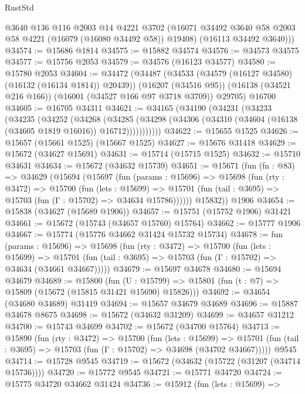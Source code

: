 \begin{lexlean}{RustStd}
\begin{coremodule}
        @3640
        @136
        @116
        @2003
        @14
        @4221
        @3702
        (@16071 @34492 @3640 @58 @2003 @58 @4221 (@16079 (@16080 @34492 @58)) @19408)
        (@16113 @34492 @3640)))
@34574 := @15686 @1814
@34575 := @15882 @34574
@34576 := @34573 @34575
@34577 := @15756 @2053
@34579 := @34576 (@16123 @34577)
@34580 := @15780 @2053
@34604 := @34472
    (@34487
      (@34533 (@34579 (@16127 @34580) (@16132 (@16134 @1814)) @20439))
      (@16207 (@34516 @95))
      (@16138 (@34521 @216 @166))
      (@16001 (@34527 @166 @97 @3718 @3709))
      @29705)
    @16700
@34605 := @16705 @34311
@34621 := @34165
    (@34190
      (@34231
        (@34233
          (@34235
            (@34252
              (@34268
                (@34285
                  (@34298 (@34306 (@34310 (@34604 (@16138 (@34605 @1819 @16016)) @16712)))))))))))
@34622 := @15655 @1525
@34626 := @15657 (@15661 @1525) (@15667 @1525)
@34627 := @15676 @31418
@34629 := @15672 (@34627 @15691)
@34631 := @15714 (@15715 @1525)
@34632 := @15710 @34631
@34634 := @15672 (@34632 @15739)
@34651 := @15671
    (fun (fn : @83) =>
    @34629
      (@15694
        (@15697
          (fun (params : @15696) =>
          @15698
            (fun (rty : @3472) =>
            @15700
              (fun (lets : @15699) =>
              @15701 (fun (tail : @3695) => @15703 (fun (Γ : @15702) => @34634 @15786))))))
        @15832))
    @1906
@34654 := @15838 (@34627 (@15689 @1906))
@34657 := @15751 (@15752 @1906) @31421
@34661 := @15672 (@15743 (@34657 @15760) @15764)
@34662 := @15777 @1906
@34667 := @15774 (@15776 @34662 @31424 @15732 @15734)
@34678 := fun (params : @15696) =>
  @15698
    (fun (rty : @3472) =>
    @15700
      (fun (lets : @15699) =>
      @15701 (fun (tail : @3695) => @15703 (fun (Γ : @15702) => @34634 (@34661 @34667)))))
@34679 := @15697 @34678
@34680 := @15694 @34679
@34689 := @15800
    (fun (U : @15799) => @15801 (fun (t : @7) => @15809 (@15672 (@15815 @31421 @15690) @15826)))
@34692 := @34654 (@34680 @34689) @31419
@34694 := @15657 @34679 @34689
@34696 := @15887 @34678 @8675
@34698 := @15672 (@34632 @31209)
@34699 := @34657 @31212
@34700 := @15743 @34699
@34702 := @15672 (@34700 @15764)
@34713 := @15890
    (fun (rty : @3472) =>
    @15700
      (fun (lets : @15699) =>
      @15701 (fun (tail : @3695) => @15703 (fun (Γ : @15702) => @34698 (@34702 @34667)))))
    @9545
@34714 := @15728 @9545
@34719 := @15672 (@34632 (@15722 (@31207 (@34714 @15736))))
@34720 := @15772 @9545
@34721 := @15771 @34720
@34724 := @15775 @34720 @34662 @31424
@34736 := @15912
    (fun (lets : @15699) =>

\end{coremodule}
\end{lexlean}
